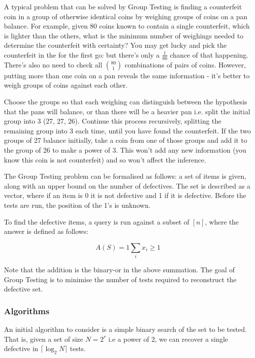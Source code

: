 A typical problem that can be solved by Group Testing is finding a counterfeit coin in a group of otherwise identical coins by weighing groups of coins on a pan balance. For example, given 80 coins known to contain a single counterfeit, which is lighter than the others, what is the minimum number of weighings needed to determine the counterfeit with certainty? You may get lucky and pick the counterfeit in the for the first go: but there's only a \(\frac{1}{80}\) chance of that happening. There's also no need to check all \(80 \choose 1\) combinations of pairs of coins. However, putting more than one coin on a pan reveals the same information  - it's better to weigh groups of coins against each other.

Choose the groups so that each weighing can distinguish between the hypothesis that the pans will balance, or than there will be a heavier pan i.e. split the initial group into 3 (27, 27, 26). Continue this process recursively, splitting the remaining group into 3 each time, until you have found the counterfeit. If the two groups of 27 balance initially, take a coin from one of those groups and add it to the group of 26 to make a power of 3. This won't add any new information (you know this coin is not counterfeit) and so won't affect the inference.

The Group Testing problem can be formalised as follows: a set of items is given, along with an upper bound on the number of defectives. The set is described as a vector, where if an item is 0 it is not defective and 1 if it is defective. Before the tests are run, the position of the 1's is unknown. 

To find the defective items, a query is run against a subset of \([n]\), where the answer is defined as follows:

\begin{equation}
A\left(S\right) = 1 \sum_{i} x_i \geq 1
\end{equation}

Note that the addition is the binary-or in the above summation. The goal of Group Testing is to minimise the number of tests required to reconstruct the defective set.

\subsubsection*{Algorithms}
An initial algorithm to consider is a simple binary search of the set to be tested. That is, given a set of size \(N = 2^r\) i.e a power of 2, we can recover a single defective in
\(\lceil{\log_2{N}}\rceil\) tests.

